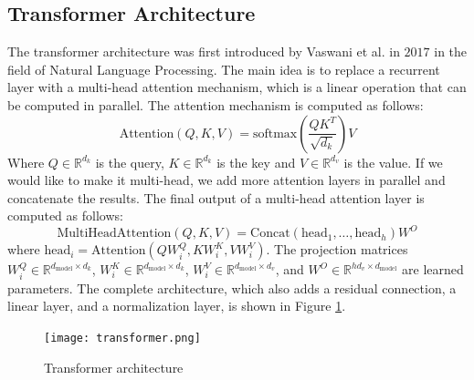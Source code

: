 \subsection{Transformer Architecture}
The transformer architecture was first introduced by Vaswani et al. in $2017$ in
the field of Natural Language Processing. The main idea is to replace a
recurrent layer with a multi-head attention mechanism, which is a linear
operation that can be computed in parallel.
The attention mechanism is computed as follows:
\begin{equation}
  \label{eq:attention}
  \text{Attention}(Q,K,V) = \text{softmax}(\frac{QK^T}{\sqrt{d_k}})V
\end{equation}
Where $Q \in \mathbb{R}^{d_k}$ is the query, $K \in \mathbb{R}^{d_k}$ is the key
and $V \in \mathbb{R}^{d_v}$ is the value. If we would like to make it
multi-head, we add more attention layers in parallel and concatenate the
results. The final output of a multi-head attention layer is computed as
follows:
\begin{equation}
  \label{eq:multiheadattention}
  \text{MultiHeadAttention}(Q,K,V) = \text{Concat}(\text{head}_1, \dots,
  \text{head}_h)W^O
\end{equation}
where $\text{head}_i = \text{Attention}(QW_i^Q, KW_i^K, VW_i^V)$.
The projection matrices $W_i^Q \in \mathbb{R}^{d_{\text{model}} \times d_k}$,
$W_i^K \in \mathbb{R}^{d_{\text{model}} \times d_k}$, $W_i^V \in
\mathbb{R}^{d_{\text{model}} \times d_v}$, and $W^O \in \mathbb{R}^{hd_v \times
d_\text{model}}$ are learned parameters. The complete architecture, which also
adds a residual connection, a linear layer, and a normalization layer, is shown
in Figure \ref{fig:transformer}.
\begin{figure}[h]
  \centering
  \texttt{[image: transformer.png]}
  \caption{Transformer architecture}
  \label{fig:transformer}
\end{figure}

